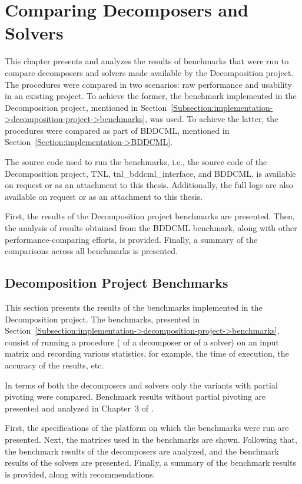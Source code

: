 \chapter{Comparing Decomposers and Solvers}\label{Chapter:comparing-decomposers-and-solvers}

This chapter presents and analyzes the results of benchmarks that were run to compare decomposers and solvers made available by the Decomposition project.
The procedures were compared in two scenarios: raw performance and usability in an existing project.
To achieve the former, the benchmark implemented in the Decomposition project, mentioned in Section~\ref{Subsection:implementation->decomposition-project->benchmarks}, was used.
To achieve the latter, the procedures were compared as part of BDDCML, mentioned in Section~\ref{Section:implementation->BDDCML}.

The source code used to run the benchmarks, i.e., the source code of the Decomposition project, TNL, tnl\_bddcml\_interface, and BDDCML, is available on request or as an attachment to this thesis.
Additionally, the full logs are also available on request or as an attachment to this thesis.

First, the results of the Decomposition project benchmarks are presented.
Then, the analysis of results obtained from the BDDCML benchmark, along with other performance-comparing efforts, is provided.
Finally, a summary of the comparisons across all benchmarks is presented.

\section{Decomposition Project Benchmarks}\label{Section:comparing-decomposers-and-solvers->decomposition-project-benchmarks}
This section presents the results of the benchmarks implemented in the Decomposition project.
The benchmarks, presented in Section~\ref{Subsection:implementation->decomposition-project->benchmarks}, consist of running a procedure ( of a decomposer or  of a solver) on an input matrix and recording various statistics, for example, the time of execution, the accuracy of the results, etc.

In terms of both the decomposers and solvers only the variants with partial pivoting were compared.
Benchmark results without partial pivoting are presented and analyzed in Chapter~3 of  \cite{Cejka2022}.

First, the specifications of the platform on which the benchmarks were run are presented.
Next, the matrices used in the benchmarks are shown.
Following that, the benchmark results of the decomposers are analyzed, and the benchmark results of the solvers are presented.
Finally, a summary of the benchmark results is provided, along with recommendations.

